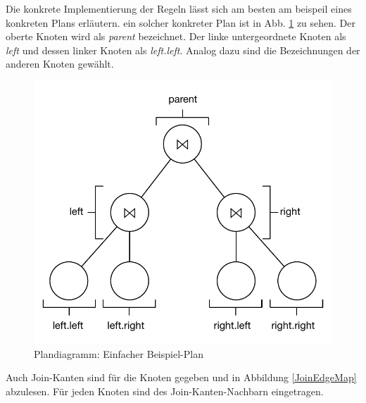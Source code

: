 Die konkrete Implementierung der Regeln lässt sich am besten am beispeil eines konkreten Plans erläutern. ein solcher konkreter Plan ist in Abb. \ref{SimplePlan} zu sehen. Der oberte Knoten wird als \textit{parent} bezeichnet. Der linke untergeordnete Knoten als \textit{left} und dessen linker Knoten als \textit{left.left}. Analog dazu sind die Bezeichnungen der anderen Knoten gewählt. 

\begin{figure}[ht]
  \centering
  \includegraphics{04_Implementierung/Plan.pdf}
  \caption{Plandiagramm: Einfacher Beispiel-Plan}
  \label{SimplePlan}
\end{figure}

Auch Join-Kanten sind für die Knoten gegeben und in Abbildung \ref{JoinEdgeMap} abzulesen. Für jeden Knoten sind des Join-Kanten-Nachbarn eingetragen.
